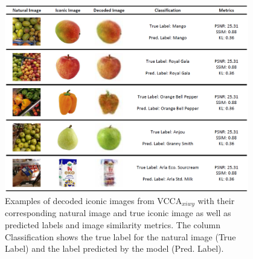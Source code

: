 
\begin{figure}[t]
    \centering
    \includegraphics[width=0.95\textwidth]{PaperB/figures_and_tables/figure10.png}
    \caption{Examples of decoded iconic images from VCCA$_{xiwy}$ with their corresponding natural image and true iconic image as well as predicted labels and image similarity metrics. The column Classification shows the true label for the natural image (True Label) and the label predicted by the model (Pred. Label). %
    }
    \label{fig:decoded_iconic_images_with_metrics}
\end{figure}